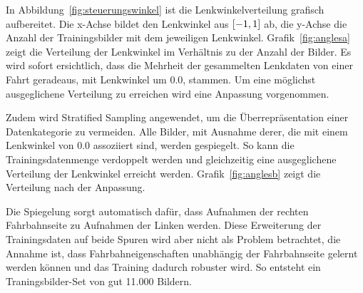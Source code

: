 In Abbildung~\ref{fig:steuerungswinkel} ist die Lenkwinkelverteilung grafisch aufbereitet. Die x-Achse bildet den Lenkwinkel aus $\interval{-1}{1}$ ab, die y-Achse die Anzahl der Trainingsbilder mit dem jeweiligen Lenkwinkel. Grafik~\ref{fig:anglesa} zeigt die Verteilung der Lenkwinkel im Verhältnis zu der Anzahl der Bilder. Es wird sofort ersichtlich, dass die Mehrheit der gesammelten Lenkdaten von einer Fahrt geradeaus, mit Lenkwinkel um 0.0, stammen. Um eine möglichst ausgeglichene Verteilung zu erreichen wird eine Anpassung vorgenommen.

Zudem wird Stratified Sampling \cite{liu2012stratified} angewendet, um die Überrepräsentation einer Datenkategorie zu vermeiden.
Alle Bilder, mit Ausnahme derer, die mit einem Lenkwinkel von 0.0 assoziiert sind, werden gespiegelt. So kann die Trainingsdatenmenge verdoppelt werden und gleichzeitig eine ausgeglichene Verteilung der Lenkwinkel erreicht werden. Grafik~\ref{fig:anglesb} zeigt die Verteilung nach der Anpassung.

Die Spiegelung sorgt automatisch dafür, dass Aufnahmen der rechten Fahrbahnseite zu Aufnahmen der Linken werden. Diese Erweiterung der Trainingsdaten auf beide Spuren wird aber nicht als Problem betrachtet, die Annahme ist, dass Fahrbahneigenschaften unabhängig der Fahrbahnseite gelernt werden können und das Training dadurch robuster wird. So entsteht ein Traningsbilder-Set von gut 11.000 Bildern.

